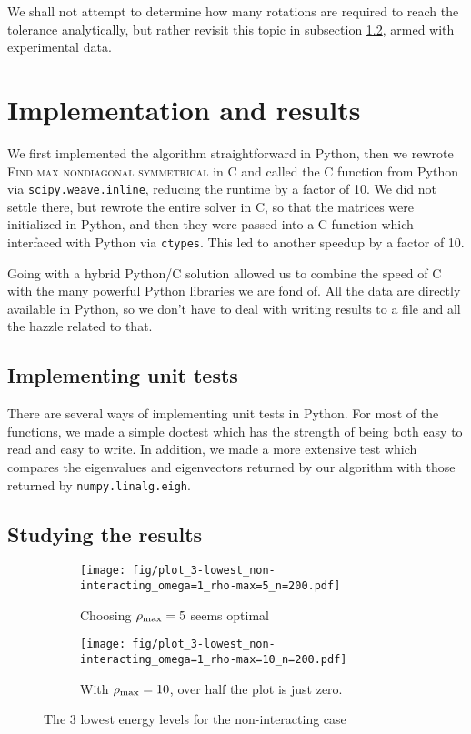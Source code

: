 \documentclass[a4paper]{article}
\begin{document}
We shall not attempt to determine how many rotations are required to reach the tolerance analytically, but rather revisit this topic in subsection \ref{subsec:studying_the_results}, armed with experimental data.

\section{Implementation and results}\label{sec:implementation_and_results}

We first implemented the algorithm straightforward in Python, then we rewrote \textsc{Find max nondiagonal symmetrical} in C and called the C function from Python via \texttt{scipy.weave.inline}, reducing the runtime by a factor of 10. We did not settle there, but rewrote the entire solver in C, so that the matrices were initialized in Python, and then they were passed into a C function which interfaced with Python via \texttt{ctypes}. This led to another speedup by a factor of 10.

Going with a hybrid Python/C solution allowed us to combine the speed of C with the many powerful Python libraries we are fond of. All the data are directly available in Python, so we don't have to deal with writing results to a file and all the hazzle related to that.

\subsection{Implementing unit tests}
There are several ways of implementing unit tests in Python. For most of the functions, we made a simple doctest which has the strength of being both easy to read and easy to write. In addition, we made a more extensive test which compares the eigenvalues and eigenvectors returned by our algorithm with those returned by \texttt{numpy.linalg.eigh}.

\subsection{Studying the results}\label{subsec:studying_the_results}
\begin{figure}[ht]
\begin{subfigure}[t]{0.5\textwidth}
\texttt{[image: fig/plot\_3-lowest\_non-interacting\_omega=1\_rho-max=5\_n=200.pdf]}
\caption{Choosing ${\rho_{\mathrm{max}}} = 5$ seems optimal}
\end{subfigure}
\begin{subfigure}[t]{0.5\textwidth}
\texttt{[image: fig/plot\_3-lowest\_non-interacting\_omega=1\_rho-max=10\_n=200.pdf]}
\caption{With ${\rho_{\mathrm{max}}} = 10$, over half the plot is just zero.}
\end{subfigure}

\caption{The 3 lowest energy levels for the non-interacting case}
\label{fig:non-interacting_compare_rho_max}
\end{figure}
\end{document}

